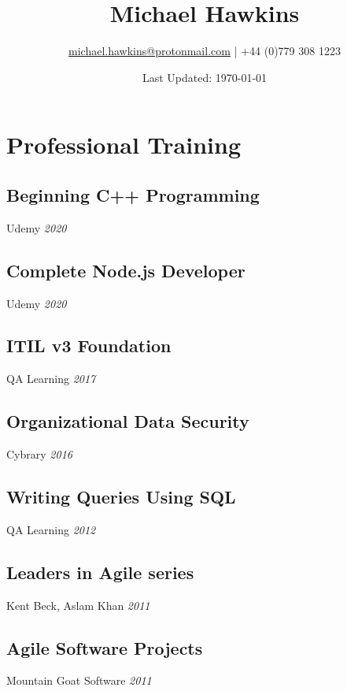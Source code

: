 \documentclass[a4paper]{article}
\title{Michael Hawkins}
\author{\href{mailto:michael.hawkins@protonmail.com}{michael.hawkins@protonmail.com} | +44 (0)779 308 1223}
\date{Last Updated: \today}
\begin{document}
%
\maketitle
%
%
\begin{minipage}[t]{0.30\textwidth}

%


%
%
%
\section{Professional Training}
%	
	\subsection{Beginning C++ Programming}
	Udemy \textit{2020}
%	
	\subsection{Complete Node.js Developer}
	Udemy \textit{2020}
%	
%	
	\subsection{ITIL v3 Foundation}
	QA Learning \textit{2017}
%	
	\subsection{Organizational Data Security}
	Cybrary \textit{2016}
%		
	\subsection{Writing Queries Using SQL}
	QA Learning \textit{2012}
%	
	\subsection{Leaders in Agile series}
	Kent Beck, Aslam Khan \textit{2011}
%	
	\subsection{Agile Software Projects}
	Mountain Goat Software \textit{2011}
%
\end{minipage}
\hfill
%
%
\end{document}
